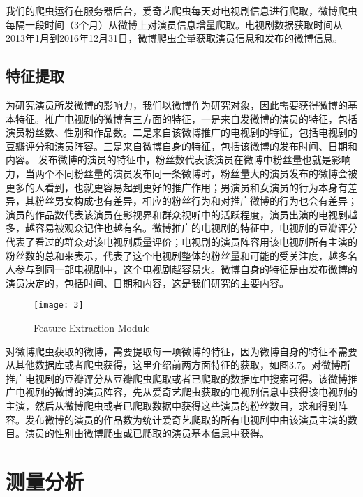 我们的爬虫运行在服务器后台，爱奇艺爬虫每天对电视剧信息进行爬取，微博爬虫每隔一段时间（3个月）从微博上对演员信息增量爬取。电视剧数据获取时间从2013年1月到2016年12月31日，微博爬虫全量获取演员信息和发布的微博信息。

\subsection{特征提取}
为研究演员所发微博的影响力，我们以微博作为研究对象，因此需要获得微博的基本特征。推广电视剧的微博有三方面的特征，一是来自发微博的演员的特征，包括演员粉丝数、性别和作品数。二是来自该微博推广的电视剧的特征，包括电视剧的豆瓣评分和演员阵容。三是来自微博自身的特征，包括该微博的发布时间、日期和内容。
发布微博的演员的特征中，粉丝数代表该演员在微博中粉丝量也就是影响力，当两个不同粉丝量的演员发布同一条微博时，粉丝量大的演员发布的微博会被更多的人看到，也就更容易起到更好的推广作用；男演员和女演员的行为本身有差异，其粉丝男女构成也有差异，相应的粉丝行为和对推广微博的行为也会有差异；演员的作品数代表该演员在影视界和群众视听中的活跃程度，演员出演的电视剧越多，越容易被观众记住也越有名。微博推广的电视剧的特征中，电视剧的豆瓣评分代表了看过的群众对该电视剧质量评价；电视剧的演员阵容用该电视剧所有主演的粉丝数的总和来表示，代表了这个电视剧整体的粉丝量和可能的受关注度，越多名人参与到同一部电视剧中，这个电视剧越容易火。微博自身的特征是由发布微博的演员决定的，包括时间、日期和内容，这是我们研究的主要内容。

\begin{figure}[!htbp]
\centering
\texttt{[image: 3]}
\caption{Feature Extraction Module}
\label{3}
\end{figure}

对微博爬虫获取的微博，需要提取每一项微博的特征，因为微博自身的特征不需要从其他数据库或者爬虫获得，这里介绍前两方面特征的获取，如图3.7。对微博所推广电视剧的豆瓣评分从豆瓣爬虫爬取或者已爬取的数据库中搜索可得。该微博推广电视剧的微博的演员阵容，先从爱奇艺爬虫获取的电视剧信息中获得该电视剧的主演，然后从微博爬虫或者已爬取数据中获得这些演员的粉丝数目，求和得到阵容。发布微博的演员的作品数为统计爱奇艺爬取的所有电视剧中由该演员主演的数目。演员的性别由微博爬虫或已爬取的演员基本信息中获得。

\section{测量分析}
